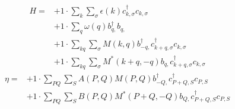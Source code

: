 \begin{align*}
	H = 	&+1 \cdot \sum_{ k } \sum_{ \sigma } \epsilon( k )   c_{ k, \sigma }^\dagger  c_{ k, \sigma }  \\
	&+1 \cdot \sum_{ q } \omega( q )   b_{ q, }^\dagger  b_{ q, }  \\
	&+1 \cdot \sum_{ k q } \sum_{ \sigma } M( k, q )   b_{ -q, }^\dagger  c_{ k+q, \sigma }^\dagger  c_{ k, \sigma }  \\
	&+1 \cdot \sum_{ k q } \sum_{ \sigma } M^*( k+q, -q )   b_{ q, } c_{ k+q, \sigma }^\dagger  c_{ k, \sigma } 
\end{align*}
\begin{align*}
	\eta = 	&+1 \cdot \sum_{ P Q } \sum_{ S } A( P, Q )  M( P, Q )   b_{ -Q, }^\dagger  c_{ P+Q, S }^\dagger  c_{ P, S }  \\
	&+1 \cdot \sum_{ P Q } \sum_{ S } B( P, Q )  M^*( P+Q, -Q )   b_{ Q, } c_{ P+Q, S }^\dagger  c_{ P, S } 
\end{align*}
